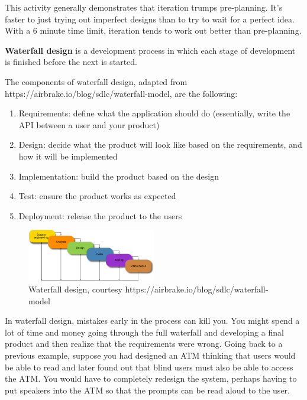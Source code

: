 This activity generally demonstrates that iteration trumps pre-planning. It's faster to just trying out imperfect designs than to try to wait for a perfect idea. With a 6 minute time limit, iteration tends to work out better than pre-planning. 

\begin{definition}
\textbf{Waterfall design} is a development process in which each stage of development is finished before the next is started. 
\end{definition}

The components of waterfall design, adapted from https://airbrake.io/blog/sdlc/waterfall-model, are the following:
\begin{enumerate}
	\item Requirements: define what the application should do (essentially, write the API between a user and your product)
	\item Design: decide what the product will look like based on the requirements, and how it will be implemented
	\item Implementation: build the product based on the design
	\item Test: ensure the product works as expected
	\item Deployment: release the product to the users
\end{enumerate}

\begin{figure}
	\centering
	\includegraphics[width=0.5\textwidth]{images/waterfall.png}
	\caption{Waterfall design, courtesy https://airbrake.io/blog/sdlc/waterfall-model}
\end{figure}

In waterfall design, mistakes early in the process can kill you. You might spend a lot of time and money going through the full waterfall and developing a final product and then realize that the requirements were wrong. Going back to a previous example, suppose you had designed an ATM thinking that users would be able to read and later found out that blind users must also be able to access the ATM. You would have to completely redesign the system, perhaps having to put speakers into the ATM so that the prompts can be read aloud to the user. 

